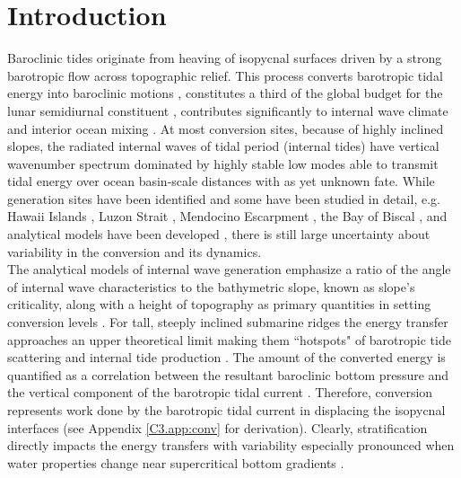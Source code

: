\documentclass[12pt]{article}
\begin{document}
\section{Introduction}
\label{C3.sec:intro}
Baroclinic tides originate from heaving of isopycnal surfaces driven by a strong 
barotropic flow across topographic relief. This process converts barotropic tidal 
energy into baroclinic motions \citep{hendershott1981long}, constitutes a 
third of the global budget for the lunar semidiurnal constituent \citep{egbert2000significant, 
munk1997once}, contributes significantly to internal wave climate \citep{wunsch1975deep} and 
interior ocean mixing \citep{wunsch2004vertical}. At most conversion sites, because of highly 
inclined slopes, the radiated 
internal waves of tidal period (internal tides) have vertical wavenumber spectrum dominated by 
highly stable low modes \citep{st2002role} able to transmit tidal energy over ocean basin-scale 
distances \citep{zhao2016global} with as yet unknown fate. While generation sites have been 
identified 
\citep{morozov1995semidiurnal, simmons2004internal, arbic2010concurrent} and some have been 
studied in detail, e.g. Hawaii Islands \citep{rudnick2003tides}, Luzon Strait 
\citep{alford2015formation}, Mendocino Escarpment \citep{althaus2003internal}, 
the Bay of Biscal 
\citep{gerkema2004internal}, and analytical models have been developed \citep{garrett2007internal}, 
there is still large uncertainty about variability in the conversion and its dynamics.\\

The analytical models of internal wave generation emphasize a ratio of the angle of internal wave 
characteristics to the bathymetric slope, known as slope's criticality, 
\citep{sutherland2010internal, 
garrett2007internal} along with a height of topography as primary quantities in setting conversion 
levels \citep{llewellyn2003tidal, petrelis2006tidal}. For tall, steeply inclined submarine ridges 
the energy transfer approaches an upper theoretical limit \citep{petrelis2006tidal, 
st2003generation} making them ``hotspots" of barotropic tide scattering and internal tide 
production \citep{morozov1995semidiurnal, egbert2000significant}. The amount of the converted 
energy is 
quantified as a correlation between the resultant baroclinic bottom pressure and the 
vertical component of the barotropic tidal current \citep{kurapov2003m, simmons2004internal}. 
Therefore, conversion  
represents work done by the 
barotropic tidal current in displacing the isopycnal interfaces (see Appendix \ref{C3.app:conv} for 
derivation). Clearly, stratification  
directly 
impacts the energy transfers \citep{holloway1999internal} with variability especially 
pronounced when water properties change near supercritical bottom gradients 
\citep{gerkema2004internal}.\\
\end{document}
